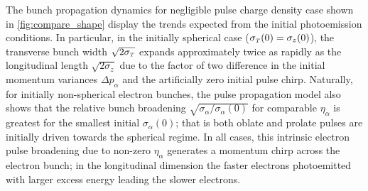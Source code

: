 The bunch propagation dynamics for negligible pulse charge density case shown in \ref{fig:compare_shape} display the trends expected from the initial photoemission conditions.
In particular, in the initially spherical case ($ \sigma_{{\scriptscriptstyle T}} (0) = \sigma_{z} (0) $), the transverse bunch width $ \sqrt{2 \sigma_{{\scriptscriptstyle T}}} $ expands approximately twice as rapidly as the longitudinal length $ \sqrt{2 \sigma_{z}} $ due to the factor of two difference in the initial momentum variances $ \Delta p_{\alpha} $ and the artificially zero initial pulse chirp.
Naturally, for initially non-spherical electron bunches, the pulse propagation model also shows that the relative bunch broadening $ \sqrt{ \sigma_{\alpha} / \sigma_{\alpha} (0) } $ for comparable $ \eta_{\alpha} $ is greatest for the smallest initial $ \sigma_{\alpha} (0) $; that is both oblate and prolate pulses are initially driven towards the spherical regime.
In all cases, this intrinsic electron pulse broadening due to non-zero $ \eta_{\alpha} $ generates a momentum chirp across the electron bunch; in the longitudinal dimension the faster electrons photoemitted with larger excess energy leading the slower electrons.

